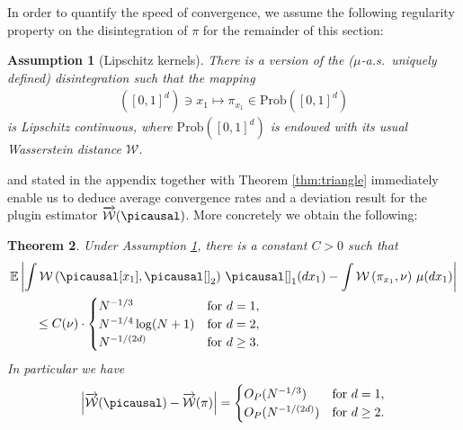 \documentclass[10pt]{amsart}
\newtheorem{theorem}{Theorem}[section]
\newtheorem{assumption}[theorem]{Assumption}
\newcommand{\E}{\mathbb{E}}
\begin{document}
In order to quantify the speed of convergence, we assume the following regularity property on the disintegration of $\pi$ for the remainder of this section:

\begin{assumption}[Lipschitz kernels]
\label{ass:lipschitz.kernel}
	There is a version of the ($\mu$-a.s.\ uniquely defined) disintegration such that the mapping
	\begin{align*}
	([0,1]^d)
	\ni x_1
	\mapsto \pi_{x_1}
	\in \mathrm{Prob}([0,1]^d)
	\end{align*}
	is Lipschitz continuous, where $\mathrm{Prob}([0,1]^d)$ is endowed with its usual Wasserstein distance $\mathcal{W}$.
\end{assumption} 

\cite[Lemma 1.3]{jwb} and \cite[Lemma 1.4]{jwb} stated in the appendix together with Theorem \ref{thm:triangle} immediately enable us to deduce average convergence rates and a deviation result for the plugin estimator $\overrightarrow{\mathcal{W}}(\picausal)$. More concretely we obtain the following:

\begin{theorem}
Under Assumption \ref{ass:lipschitz.kernel}, there is a constant $C>0$ such that 
\begin{align*}
&\E \left| \int \mathcal{W}\left(\picausal[x_1],\picausal[]_2\right)\,\picausal[]_1(dx_1) -\int \mathcal{W}\left(\pi_{x_1},\nu\right)\,\mu(dx_1) \right|\\
&\qquad\le C(\nu) \cdot
	\begin{cases}
	N^{-1/3} &\text{for } d=1,\\
	N^{-1/4}\log(N+1) &\text{for } d=2,\\
	N^{-1/(2d)} &\text{for } d\geq 3.
	\end{cases} \\
\end{align*}
In particular we have
\begin{align*}
\left| \overrightarrow{\mathcal{W}}(\picausal) -\overrightarrow{\mathcal{W}}(\pi)\right| =
	\begin{cases}
	O_P(N^{-1/3}) &\text{for } d=1,\\
	O_P(N^{-1/(2d)}) &\text{for } d\geq 2.
	\end{cases} 
\end{align*}
\end{theorem}
\end{document}
